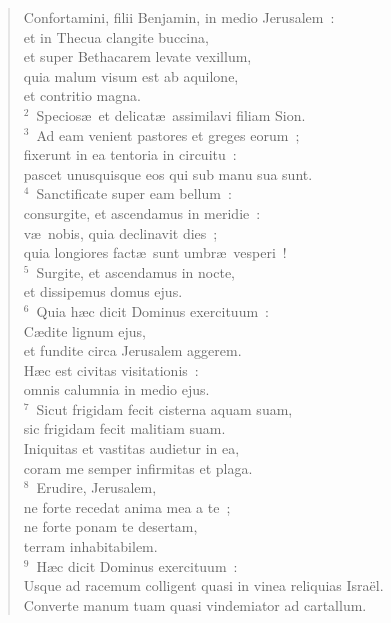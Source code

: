 \begin{flushleft}\begin{verse}\vspace{-19pt}Confortamini, filii Benjamin, in medio Jerusalem~:\\ et in Thecua clangite buccina,\\ et super Bethacarem levate vexillum,\\ quia malum visum est ab aquilone,\\ et contritio magna.\\
${}^{2}$~Specios\ae\ et delicat\ae\ assimilavi filiam Sion.\\
${}^{3}$~Ad eam venient pastores et greges eorum~;\\ fixerunt in ea tentoria in circuitu~:\\ pascet unusquisque eos qui sub manu sua sunt.\\
${}^{4}$~Sanctificate super eam bellum~:\\ consurgite, et ascendamus in meridie~:\\ v\ae\ nobis, quia declinavit dies~;\\ quia longiores fact\ae\ sunt umbr\ae\ vesperi~!\\
${}^{5}$~Surgite, et ascendamus in nocte,\\ et dissipemus domus ejus.\\
${}^{6}$~Quia h\ae c dicit Dominus exercituum~:\\ C\ae dite lignum ejus,\\ et fundite circa Jerusalem aggerem.\\ H\ae c est civitas visitationis~:\\ omnis calumnia in medio ejus.\\
${}^{7}$~Sicut frigidam fecit cisterna aquam suam,\\ sic frigidam fecit malitiam suam.\\ Iniquitas et vastitas audietur in ea,\\ coram me semper infirmitas et plaga.\\
${}^{8}$~Erudire, Jerusalem,\\ ne forte recedat anima mea a te~;\\ ne forte ponam te desertam,\\ terram inhabitabilem.\\
${}^{9}$~H\ae c dicit Dominus exercituum~:\\ Usque ad racemum colligent quasi in vinea reliquias Isra\"el.\\ Converte manum tuam quasi vindemiator ad cartallum.\\

\end{verse}
\end{flushleft}
